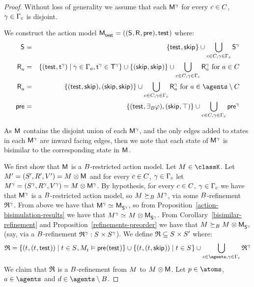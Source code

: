 \begin{proof}
Without loss of generality we assume that each $\aModel[\gamma]$ for every $\agentC \in \agentsC$, $\gamma \in \Gamma_\agentC$ is disjoint.

We construct the action model $\aPModelAndTuple{\aStateTest}$ where:
\begin{eqnarray*}
    \aStates &=& \{\aStateTest, \aStateSkip\} \cup \bigcup_{\agentC \in \agentsC, \gamma \in \Gamma_\agentC} \aStates[\gamma]\\
    \aAccessibilityA &=& \{(\aStateTest, \aStateT[\gamma]) \mid \gamma \in \Gamma_\agentA, \aStateT[\gamma] \in \aStatesT[\gamma]\} \cup \{(\aStateSkip, \aStateSkip)\} \cup \bigcup_{\agentC \in \agentsC, \gamma \in \Gamma_\agentC} \aAccessibilityA[\gamma] \text{ for } \agentA \in \agentsC\\
    \aAccessibilityA &=& \{(\aStateTest, \aStateSkip), (\aStateSkip, \aStateSkip)\} \cup \bigcup_{\agentC \in \agentsC, \gamma \in \Gamma_\agentC} \aAccessibilityA[\gamma] \text{ for } \agentA \in \agents \setminus \agentsC\\
    \aPrecondition &=& \{(\aStateTest, \someactsBs \phi), (\aStateSkip, \top)\} \cup \bigcup_{\agentC \in \agentsC, \gamma \in \Gamma_\agentC} \aPrecondition[\gamma]
\end{eqnarray*}

As $\aModel$ contains the disjoint union of each $\aModel[\gamma]$, and the only edges added to states in each $\aModel[\gamma]$ are inward facing edges, then we note that each state of $\aModel[\gamma]$ is bisimilar to the corresponding state in $\aModel$.

We first show that $\aModel$ is a $\agentsB$-restricted action model.
Let $\kModel \in \classK$.
Let $\kModelAndTupleP = \kModel \exec \aModel$ and for every $\agentC \in \agentsC$, $\gamma \in \Gamma_\agentC$ let $\kModelAndTuple[\gamma] = \kModel \exec \aModel[\gamma]$.
By hypothesis, for every $\agentC \in \agentsC$, $\gamma \in \Gamma_\agentC$ we have that $\aModel[\gamma]$ is a $\agentsB$-restricted action model, so $\kModel \simulatesBs \kModel[\gamma]$, via some $\agentsB$-refinement $\refinement^\gamma$.
From above we have that $\aModel[\gamma] \bisimilar \aPModel{\aStates[\gamma]}$, so from Proposition~\ref{action-bisimulation-results} we have that $\kModel[\gamma] \bisimilar \kModel \exec \aPModel{\aStates[\gamma]}$.
From Corollary~\ref{bisimilar-refinement} and Proposition~\ref{refinements-preorder} we have that $\kModel \simulatesBs \kModel \exec \aPModel{\aStates[\gamma]}$ (say, via a $\agentsB$-refinement $\refinement^\gamma : \kStates \times \kStates[\gamma]$).
We define $\refinement \subseteq \kStates \times \kStatesP$ where:
$$
\refinement = \{(\kStateT, (\kStateT, \aStateTest)) \mid \kStateT \in \kStates, \kPModel{\kStateT} \entails \aPrecondition(\aStateTest)\} \cup \{(\kStateT, (\kStateT, \aStateSkip)) \mid \kStateT \in \kStates\} \cup \bigcup_{\agentC \in \agents, \gamma \in \Gamma_\agentC} \refinement^\gamma
$$
We claim that $\refinement$ is a $\agentsB$-refinement from $\kModel$ to $\kModel \exec \aModel$.
Let $\atomP \in \atoms$, $\agentA \in \agents$ and $\agentD \in \agents \setminus \agentsB$.


\end{proof}
